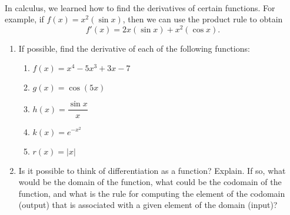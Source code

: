 \begin{previewactivity} \label{PA:derivatives} \hfill \\
In calculus, we learned how to find the derivatives
%
 of certain functions.  For example, if $f( x ) = x^2( {\sin x} )$, then we can use the product rule to obtain
\[
f'( x ) = 2x( {\sin x} ) + x^2( {\cos x} ).
\]
\begin{enumerate}
\item If possible, find the derivative of each of the following functions:
\begin{multicols}{2}
\begin{enumerate}
  \item $f( x ) = x^4  - 5x^3  + 3x - 7$

  \item $g( x ) = \cos ( {5x} )$

  \item $h( x ) = \dfrac{{\sin x}}{x}$
	
  \item $k( x ) = e^{ - x^2 } $

  \item $r( x ) = \left| x \right|$
\end{enumerate}
\end{multicols}

\item Is it possible to think of differentiation as a function?  Explain.  If so, what would be the domain of the function, what could be the codomain of the function, and what is the rule for computing the element of the codomain (output) that is associated with a given element of the domain (input)?

\end{enumerate}
\end{previewactivity}
\hbreak

\endinput
